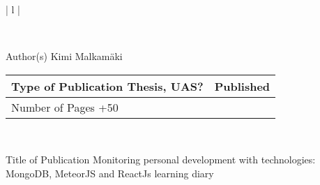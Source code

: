 \begin{tabular}{ | l | }

    \\

    \hline
    \begin{minipage}[b]{6cm}
        Author(s)
        \newline
        Kimi Malkamäki 
    \end{minipage}%
    \begin{minipage}{8.5cm}
        \begin{tabular}{ | l | c | }
            \begin{minipage}[t][1cm][t]{4.25cm}
                Type of Publication 
                \newline
                Thesis, UAS?
            \end{minipage} & %
            \begin{minipage}{3.6cm}
                Published
                \newline
                2024
            \end{minipage} \\ \hline%
            \begin{minipage}[t][1.01cm][t]{4.25cm}
                Number of Pages
                \newline 
                31+50
            \end{minipage}
            &  \\ \hline
        \end{tabular}
    \end{minipage}%
      \\ \hline

    \begin{minipage}[t][2cm][t]{14cm}
    Title of Publication
        \newline 
        Monitoring personal development with technologies: MongoDB, MeteorJS and ReactJs
        \newline 
    learning diary  
    \end{minipage}\\ \hline


\end{tabular}
